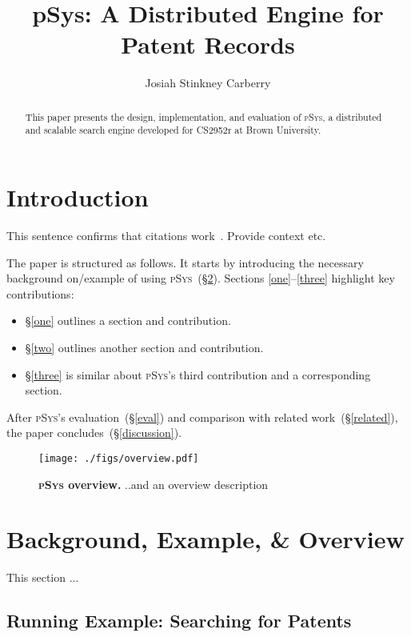 \documentclass[sigplan, screen, 10pt]{acmart}
\title{pSys: A Distributed Engine for Patent Records}
\author{Josiah Stinkney Carberry}
\affiliation{Brown University}
\newcommand{\sx}[1]{(\S\ref{#1})}
\newcommand{\sys}{{\scshape pSys}\xspace}
\begin{document}
\begin{abstract}
This paper presents the design, implementation, and evaluation of \sys, a distributed and scalable search engine developed for CS2952r at Brown University.
\end{abstract}

\maketitle


\section{Introduction}
\label{intro}

This sentence confirms that citations work~\cite{kpn74, dryad07}. Provide
context etc.

The paper is structured as follows.
It starts by introducing the necessary background on/example of using \sys~\sx{bg}.
Sections \ref{one}--\ref{three} highlight key contributions:
\begin{itemize}
	\item
	\S\ref{one}
		outlines a section and contribution.

	\item
	\S\ref{two} outlines another section and contribution.

	\item
	\S\ref{three} is similar about \sys's third contribution and a corresponding section.

\end{itemize}

\noindent
After \sys's evaluation~\sx{eval} and  comparison with related work~\sx{related}, the paper concludes~\sx{discussion}.  

\begin{figure}[t]
\centering
\texttt{[image: ./figs/overview.pdf]}
\caption{
  \textbf{\sys overview.}
  ..and an overview description
}
\vspace{-18pt}
\label{fig:overview}
\end{figure}

\section{Background, Example, \& Overview}
\label{bg}

This section ...

\subsection{Running Example: Searching for Patents}
\label{bg:patents}
\end{document}
